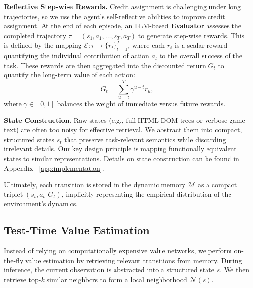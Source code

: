 \textbf{Reflective Step-wise Rewards.} Credit assignment is challenging under long trajectories, so we use the agent's self-reflective abilities to improve credit assignment. At the end of each episode, an LLM-based \textbf{Evaluator} assesses the completed trajectory $\tau = (s_1, a_1, \dots, s_T, a_T)$ to generate step-wise rewards. This is defined by the mapping $\mathcal{E}: \tau \to \{r_t\}_{t=1}^T$, where each $r_t$ is a scalar reward quantifying the individual contribution of action $a_t$ to the overall success of the task. These rewards are then aggregated into the discounted return $G_t$ to quantify the long-term value of each action:
\begin{equation}
    G_{t}=\sum_{u=t}^{T}\gamma^{u-t}r_{u},
    \label{eq:discounted_return}
\end{equation}
where $\gamma \in [0, 1]$ balances the weight of immediate versus future rewards.

\textbf{State Construction.} Raw states (e.g., full HTML DOM trees or verbose game text) are often too noisy for effective retrieval. We abstract them into compact, structured states $s_t$ that preserve task-relevant semantics while discarding irrelevant details. Our key design principle is mapping functionally equivalent states to similar representations. Details on state construction can be found in Appendix ~\ref{app:implementation}.



Ultimately, each transition is stored in the dynamic memory $\mathcal{M}$ as a compact triplet $(s_t, a_t, G_t)$, implicitly representing the empirical distribution of the environment's dynamics.



\subsection{Test-Time Value Estimation}
\label{sec:value_estimation}

Instead of relying on computationally expensive value networks, we perform on-the-fly value estimation by retrieving relevant transitions from memory. During inference, the current observation is abstracted into a structured state $s$. 
We then retrieve top-$k$ similar neighbors to form a local neighborhood $\mathcal{N}(s)$.

